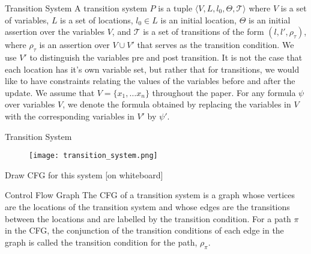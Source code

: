 \documentclass{beamer}
\begin{document}
    {
        \begin{frame}{Transition System}
            A transition system $P$ is a tuple $\langle V, L, l_{0}, \Theta, \mathcal{T} \rangle$ where $V$ is a set of variables, $L$ is a set of locations, $l_{0} \in L$ is an initial location, $\Theta$ is an initial assertion over the variables $V$, and $\mathcal{T}$ is a set of transitions of the form $(l, l', \rho_{\tau})$, where $\rho_{\tau}$ is an assertion over $V \cup V'$ that serves as the transition condition. We use $V'$ to distinguish the variables pre and post transition. It is not the case that each location has it's own variable set, but rather that for transitions, we would like to have constraints relating the values of the variables before and after the update. We assume that $V = \{x_{1}, \dots x_{n}\}$ throughout the paper. For any formula $\psi$ over variables $V$, we denote the formula obtained by replacing the variables in $V$ with the corresponding variables in $V'$ by $\psi'$.
        \end{frame}
        \begin{frame}{Transition System}
            \begin{figure}[h!]
                \texttt{[image: transition\_system.png]}
            \end{figure}
            \begin{center}
                Draw CFG for this system [on whiteboard]
            \end{center}
        \end{frame}
        \begin{frame}{Control Flow Graph}
            The CFG of a transition system is a graph whose vertices are the locations of the transition system and whose edges are the transitions between the locations and are labelled by the transition condition. For a path $\pi$ in the CFG, the conjunction of the transition conditions of each edge in the graph is called the transition condition for the path, $\rho_{\pi}$.


\end{frame}}
\end{document}
